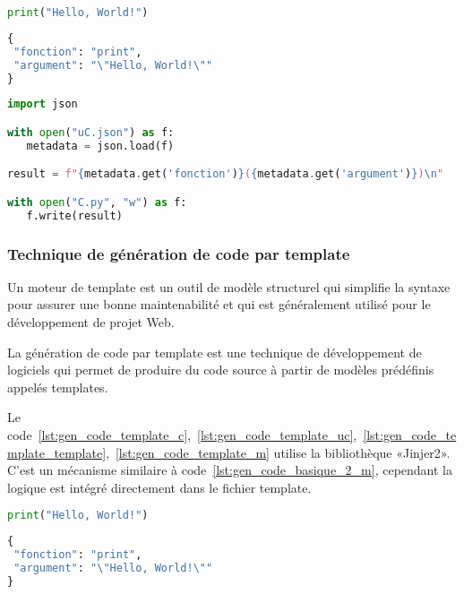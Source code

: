 \begin{lstlisting}[language=Python, upquote=true, caption={C - fichier C.py}, label={lst:gen_code_basique_2_c}]
print("Hello, World!")
\end{lstlisting}

\begin{lstlisting}[language=Python, upquote=true, caption={µ$_C$ - fichier uC.json}, label={lst:gen_code_basique_2_uc}]
{
 "fonction": "print",
 "argument": "\"Hello, World!\""
}
\end{lstlisting}

\begin{lstlisting}[language=Python, upquote=true, caption={M(µ$_C$)}, label={lst:gen_code_basique_2_m}]
import json

with open("uC.json") as f:
   metadata = json.load(f)

result = f"{metadata.get('fonction')}({metadata.get('argument')})\n"

with open("C.py", "w") as f:
   f.write(result)
\end{lstlisting}

\subsubsection{Technique de génération de code par template}

Un moteur de template est un outil de modèle structurel qui simplifie la syntaxe pour assurer une bonne maintenabilité et qui est généralement utilisé pour le développement de projet Web.

La génération de code par template est une technique de développement de logiciels qui permet de produire du code source à partir de modèles prédéfinis appelés templates.

Le code~\ref{lst:gen_code_template_c},~\ref{lst:gen_code_template_uc},~\ref{lst:gen_code_template_template},~\ref{lst:gen_code_template_m} utilise la bibliothèque «Jinjer2». C'est un mécanisme similaire à code~\ref{lst:gen_code_basique_2_m}, cependant la logique est intégré directement dans le fichier template.

\begin{lstlisting}[language=Python, upquote=true, caption={C - fichier C.py}, label={lst:gen_code_template_c}]
print("Hello, World!")
\end{lstlisting}

\begin{lstlisting}[language=Python, upquote=true, caption={µ$_C$ - fichier uC.json}, label={lst:gen_code_template_uc}]
{
 "fonction": "print",
 "argument": "\"Hello, World!\""
}
\end{lstlisting}

